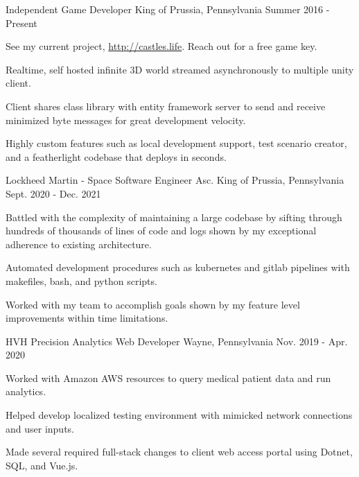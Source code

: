 \begin{cventries}
  \cventry
    {Independent} %
    {Game Developer} %
    {King of Prussia, Pennsylvania} %
    {Summer 2016 - Present} %
    {
      \begin{cvitems} %
        \item {See my current project, \url{http://castles.life}. Reach out for a free game key.}
        \item {Realtime, self hosted infinite 3D world streamed asynchronously to multiple unity client.}
        \item {Client shares class library with entity framework server to send and receive minimized byte messages for great development velocity.}
        \item {Highly custom features such as local development support, test scenario creator, and a featherlight codebase that deploys in seconds.}
      \end{cvitems}
    }

  \cventry
    {Lockheed Martin - Space} %
    {Software Engineer Asc.} %
    {King of Prussia, Pennsylvania} %
    {Sept. 2020 - Dec. 2021} %
    {
      \begin{cvitems} %
        \item {Battled with the complexity of maintaining a large codebase by sifting through hundreds of thousands of lines of code and logs shown by my exceptional adherence to existing architecture.}
        \item {Automated development procedures such as kubernetes and gitlab pipelines with makefiles, bash, and python scripts.}
        \item {Worked with my team to accomplish goals shown by my feature level improvements within time limitations.}
      \end{cvitems}
    }

  \cventry
    {HVH Precision Analytics} %
    {Web Developer} %
    {Wayne, Pennsylvania} %
    {Nov. 2019 - Apr. 2020} %
    {
      \begin{cvitems} %
        \item {Worked with Amazon AWS resources to query medical patient data and run analytics.}
        \item {Helped develop localized testing environment with mimicked network connections and user inputs.}
        \item {Made several required full-stack changes to client web access portal using Dotnet, SQL, and Vue.js.}
      \end{cvitems}
    }


\end{cventries}
